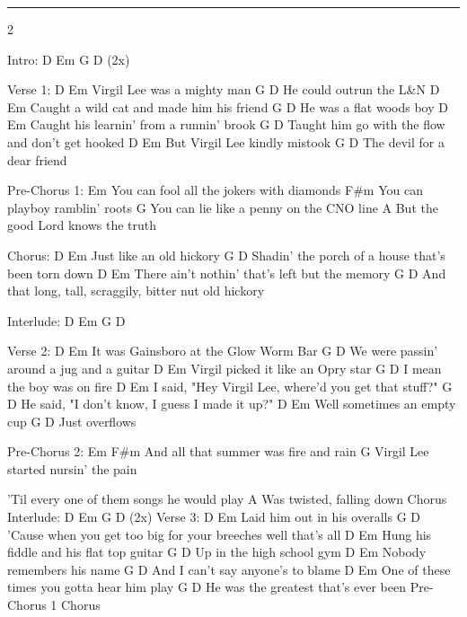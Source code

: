 \noindent\rule{\columnwidth}{1pt}

\begin{multicols}{2}
\begin{lstsong}
Intro: D Em G D (2x)

Verse 1:
D                Em
Virgil Lee was a mighty man
        G           D
He could outrun the L&N
D                     Em
Caught a wild cat and made him his friend
        G             D
He was a flat woods boy
D                          Em
Caught his learnin' from a runnin' brook
           G                    D
Taught him go with the flow and don't get hooked
D                     Em
But Virgil Lee kindly mistook
    G                      D
The devil for a dear friend
 
Pre-Chorus 1:
Em
You can fool all the jokers with diamonds
        F#m
You can playboy ramblin' roots
        G
You can lie like a penny on the CNO line
        A
But the good Lord knows the truth

Chorus:
             D    Em
Just like an old hickory
G                                             D
Shadin' the porch of a house that's been torn down
D                                       Em
There ain't nothin' that's left but the memory
G                                              D
And that long, tall, scraggily, bitter nut old hickory

Interlude: D Em G D
\end{lstsong}
\columnbreak
\begin{lstsong}

Verse 2:
D                       Em
It was Gainsboro at the Glow Worm Bar
        G                D
We were passin' around a jug and a guitar
D                        Em
Virgil picked it like an Opry star
           G              D
I mean the boy was on fire
D                                    Em
I said, "Hey Virgil Lee, where'd you get that stuff?"
         G                             D
He said, "I don't know, I guess I made it up?"
D                 Em
Well sometimes an empty cup
     G        D
Just overflows

Pre-Chorus 2:
Em                                     F#m
And all that summer was fire and rain
                                      G
Virgil Lee started nursin' the pain
 
'Til every one of them songs he would play
    A
Was twisted, falling down
Chorus
Interlude: D Em G D (2x)
Verse 3:
D                   Em
Laid him out in his overalls
                G                    D
'Cause when you get too big for your breeches well that's all
D                       Em
Hung his fiddle and his flat top guitar
G                     D
Up in the high school gym
D      Em
Nobody remembers his name
    G              D
And I can't say anyone's to blame
D                            Em
One of these times you gotta hear him play
           G                    D
He was the greatest that's ever been
Pre-Chorus 1
Chorus
\end{lstsong}
\end{multicols}
\newpage

